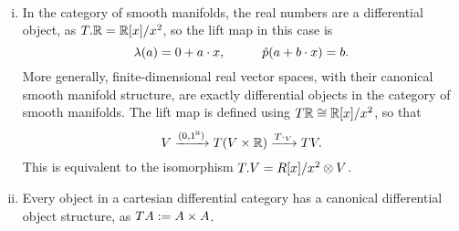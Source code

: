 \begin{example}\label{ex:diffob-sman}
    ~\begin{enumerate}[(i)]
        \item In the category of smooth manifolds, the real numbers are a differential object, as $T.\mathbb{R} = \mathbb{R}[x]/x^2$, so the lift map in this case is
        \[
            \lambda(a) = 0 + a\cdot x,  \hspace{1cm} \hat{p}(a + b\cdot x) = b. 
        \]
        More generally, finite-dimensional real vector spaces, with their canonical smooth manifold structure, are exactly differential objects in the category of smooth manifolds. The lift map is defined using $T\mathbb{R} \cong \mathbb{R}[x]/x^2$, so that
        \[ V \xrightarrow[]{(0,1^{\mathbb{R}})} T(V \times \mathbb{R}) \xrightarrow[]{T\cdot_V} TV. \]
        This is equivalent to the isomorphism $T.V = R[x]/x^2 \otimes V$.
        \item Every object in a cartesian differential category has a canonical differential object structure, as $TA := A \times A$.
    \end{enumerate}
\end{example}

